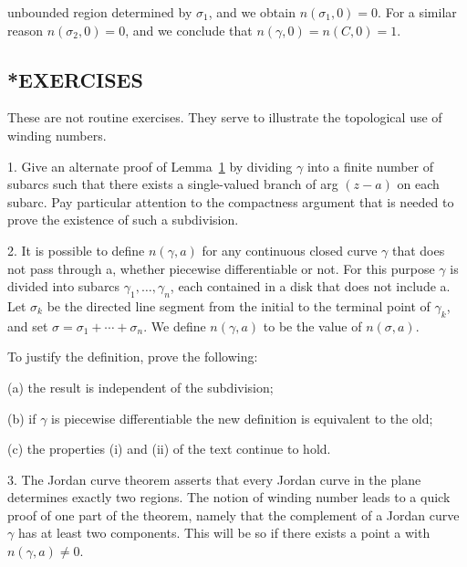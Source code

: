 unbounded region determined by $\sigma_{1}$, and we obtain $n(\sigma_{1},0) = 0$. For a similar reason $n(\sigma_{2},0) = 0$, and we conclude that $n(\gamma,0) = n(C,0) = 1$.
\subsection*{*EXERCISES}
These are not routine exercises. They serve to illustrate the topological use of winding numbers.

1. Give an alternate proof of Lemma~\hyperref[lem:4.1]{1} by dividing $\gamma$ into a finite number of subarcs such that there exists a single-valued branch of arg $(z - a)$ on each subarc. Pay particular attention to the compactness argument that is needed to prove the existence of such a subdivision.

2. It is possible to define $n(\gamma,a)$ for any continuous closed curve $\gamma$ that does not pass through a, whether piecewise differentiable or not. For this purpose $\gamma$ is divided into subarcs $\gamma_{1},\ldots,\gamma_{n}$, each contained in a disk that does not include a. Let $\sigma_{k}$ be the directed line segment from the initial to the terminal point of $\gamma_{k}$, and set $\sigma=\sigma_{1}+\cdots+\sigma_{n}$. We define $n(\gamma,a)$ to be the value of $n(\sigma,a)$.

To justify the definition, prove the following:

(a) the result is independent of the subdivision;

(b) if $\gamma$ is piecewise differentiable the new definition is equivalent to the old;

(c) the properties (i) and (ii) of the text continue to hold.


3. The Jordan curve theorem asserts that every Jordan curve in the plane determines exactly two regions. The notion of winding number leads to a quick proof of one part of the theorem, namely that the complement of a Jordan curve $\gamma$ has at least two components. This will be so if there exists a point a with $n(\gamma,a) \neq 0$.

